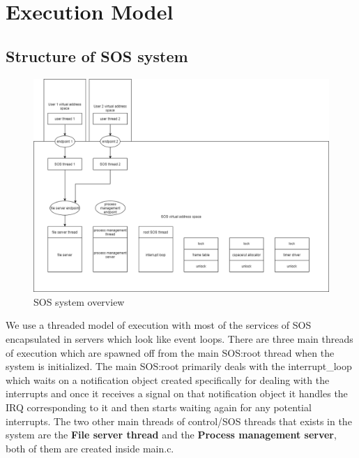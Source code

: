 
\section{Execution Model}

\subsection{Structure of SOS system}

\begin{figure}[h]
  \includegraphics[width=\linewidth]{execution_model.png}
  \caption{SOS system overview}
  \label{fig:sos_overview}
\end{figure}

We use a threaded model of execution with most of the services of SOS encapsulated in servers which look like event loops. There are three main threads of execution which are spawned off from the main SOS:root thread when the system is initialized.
The main SOS:root primarily deals with the interrupt\_loop which waits on a notification object created specifically for dealing with the interrupts and once it receives a signal on that notification object it handles the IRQ corresponding to it and then 
starts waiting again for any potential interrupts. The two other main threads of control/SOS threads that exists in the system are the \textbf{File server thread} and the \textbf{Process management server}, both of them are created inside main.c.

